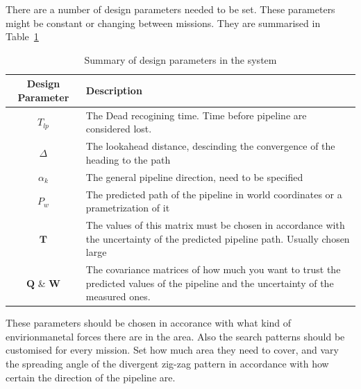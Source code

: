 	There are a number of design parameters needed to be set. These parameters might be constant or
	changing between missions. They are summarised in Table~\ref{tab:ch2-design-param}
	\begin{table}[htbp]
		\centering
		\begin{tabular}{| c | p{6cm} |}
			\hline
			Design Parameter 	& 	Description \\
			\hline
			\hline
			$T_{lp}$ 		&	The Dead recogining time. Time before pipeline are
							considered lost. \\
			\hline
			$\Delta$		&	The lookahead distance, descinding the convergence of
							the heading to the path \\
			\hline
			$\alpha_k$		&	The general pipeline direction, need to be specified\\
			\hline
			$P_w$			& 	The predicted path of the pipeline in world
							coordinates or a prametrization of it \\
			\hline
			$\mathbf{T}$		&	The values of this matrix must be chosen in accordance
							with the uncertainty of the predicted pipeline path.
							Usually chosen large \\
			\hline
			$\mathbf{Q}$ \& $\mathbf{W}$ & 	The covariance matrices of how much you want to trust
							the predicted values of the pipeline and the
							uncertainty of the measured ones. \\
			\hline
		\end{tabular}
		\caption{Summary of design parameters in the system}
		\label{tab:ch2-design-param}
	\end{table}
	These parameters should be chosen in accorance with what kind of envirionmanetal forces there are in
	the area. Also the search patterns should be customised for every mission. Set how much area they need
	to cover, and vary the spreading angle of the divergent zig-zag pattern in accordance with how certain
	the direction of the pipeline are.
	

